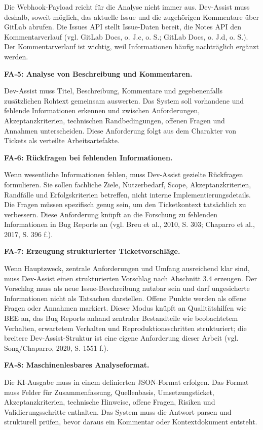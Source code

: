 \documentclass[12pt,a4paper,oneside]{scrreprt}
\begin{document}
Die Webhook-Payload reicht für die Analyse nicht immer aus. Dev-Assist muss deshalb, soweit möglich, das aktuelle Issue und die zugehörigen Kommentare über GitLab abrufen. Die Issues API stellt Issue-Daten bereit, die Notes API den Kommentarverlauf (vgl. GitLab Docs, o. J.c, o. S.; GitLab Docs, o. J.d, o. S.). Der Kommentarverlauf ist wichtig, weil Informationen häufig nachträglich ergänzt werden.

\textbf{FA-5: Analyse von Beschreibung und Kommentaren.}

Dev-Assist muss Titel, Beschreibung, Kommentare und gegebenenfalls zusätzlichen Rohtext gemeinsam auswerten. Das System soll vorhandene und fehlende Informationen erkennen und zwischen Anforderungen, Akzeptanzkriterien, technischen Randbedingungen, offenen Fragen und Annahmen unterscheiden. Diese Anforderung folgt aus dem Charakter von Tickets als verteilte Arbeitsartefakte.

\textbf{FA-6: Rückfragen bei fehlenden Informationen.}

Wenn wesentliche Informationen fehlen, muss Dev-Assist gezielte Rückfragen formulieren. Sie sollen fachliche Ziele, Nutzerbedarf, Scope, Akzeptanzkriterien, Randfälle und Erfolgskriterien betreffen, nicht interne Implementierungsdetails. Die Fragen müssen spezifisch genug sein, um den Ticketkontext tatsächlich zu verbessern. Diese Anforderung knüpft an die Forschung zu fehlenden Informationen in Bug Reports an (vgl. Breu et al., 2010, S. 303; Chaparro et al., 2017, S. 396 f.).

\textbf{FA-7: Erzeugung strukturierter Ticketvorschläge.}

Wenn Hauptzweck, zentrale Anforderungen und Umfang ausreichend klar sind, muss Dev-Assist einen strukturierten Vorschlag nach Abschnitt 3.4 erzeugen. Der Vorschlag muss als neue Issue-Beschreibung nutzbar sein und darf ungesicherte Informationen nicht als Tatsachen darstellen. Offene Punkte werden als offene Fragen oder Annahmen markiert. Dieser Modus knüpft an Qualitätshilfen wie BEE an, das Bug Reports anhand zentraler Bestandteile wie beobachtetem Verhalten, erwartetem Verhalten und Reproduktionsschritten strukturiert; die breitere Dev-Assist-Struktur ist eine eigene Anforderung dieser Arbeit (vgl. Song/Chaparro, 2020, S. 1551 f.).

\textbf{FA-8: Maschinenlesbares Analyseformat.}

Die KI-Ausgabe muss in einem definierten JSON-Format erfolgen. Das Format muss Felder für Zusammenfassung, Quellenbasis, Umsetzungsticket, Akzeptanzkriterien, technische Hinweise, offene Fragen, Risiken und Validierungsschritte enthalten. Das System muss die Antwort parsen und strukturell prüfen, bevor daraus ein Kommentar oder Kontextdokument entsteht.
\end{document}
